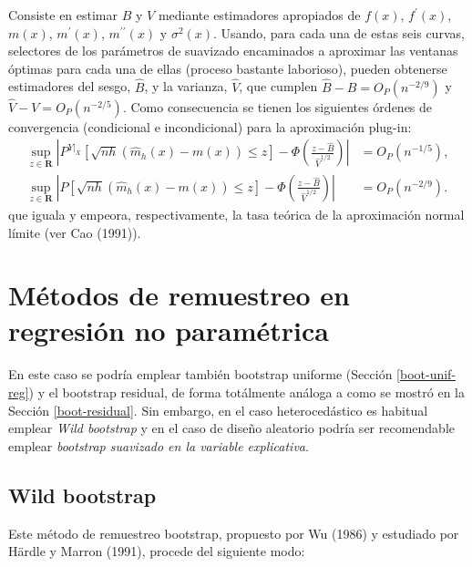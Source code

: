 \documentclass[]{book}
\theoremstyle{break}
\theoremstyle{definition}
\theoremstyle{definition}
\theoremstyle{definition}
\theoremstyle{remark}
\begin{document}
Consiste en estimar \(B\) y \(V\) mediante estimadores apropiados de
\(f\left(x \right)\), \(f^{\prime}\left( x \right)\),
\(m\left( x \right)\), \(m^{\prime}\left( x \right)\),
\(m^{\prime \prime }\left( x \right)\) y \(\sigma^2\left( x \right)\).
Usando, para cada una de estas seis curvas, selectores de los parámetros
de suavizado encaminados a aproximar las ventanas óptimas para cada una
de ellas (proceso bastante laborioso), pueden obtenerse estimadores del
sesgo, \(\hat{B}\), y la varianza, \(\hat{V}\), que cumplen
\(\hat{B}-B=O_{P}\left( n^{-2/9} \right)\) y
\(\hat{V}-V=O_{P}\left( n^{-2/5} \right)\). Como consecuencia se tienen
los siguientes órdenes de convergencia (condicional e incondicional)
para la aproximación plug-in: \[\begin{aligned}
\sup_{z\in \boldsymbol{R}}\left\vert P^{\left. Y\right\vert _{X}}\left[ 
\sqrt{nh}\left( \hat{m}_{h}\left( x \right) -m\left( x \right) \right) \leq z
\right] -\Phi \left( \frac{z-\hat{B}}{\hat{V}^{1/2}} \right) \right\vert
&= O_{P}\left( n^{-1/5} \right), \\
\sup_{z\in \boldsymbol{R}}\left\vert P\left[ \sqrt{nh}\left( \hat{m}
_{h}\left( x \right) -m\left( x \right) \right) \leq z\right] -\Phi \left( 
\frac{z-\hat{B}}{\hat{V}^{1/2}} \right) \right\vert &= O_{P}\left(
n^{-2/9} \right).
\end{aligned}\] que iguala y empeora, respectivamente, la tasa teórica
de la aproximación normal límite (ver Cao (1991)).

\section{Métodos de remuestreo en regresión no
paramétrica}\label{muxe9todos-de-remuestreo-en-regresiuxf3n-no-paramuxe9trica}

En este caso se podría emplear también bootstrap uniforme (Sección
\ref{boot-unif-reg}) y el bootstrap residual, de forma totálmente
análoga a como se mostró en la Sección \ref{boot-residual}. Sin embargo,
en el caso heterocedástico es habitual emplear \emph{Wild bootstrap} y
en el caso de diseño aleatorio podría ser recomendable emplear
\emph{bootstrap suavizado en la variable explicativa}.

\subsection{Wild bootstrap}\label{wild-bootstrap}

Este método de remuestreo bootstrap, propuesto por Wu (1986) y estudiado
por Härdle y Marron (1991), procede del siguiente modo:
\end{document}
